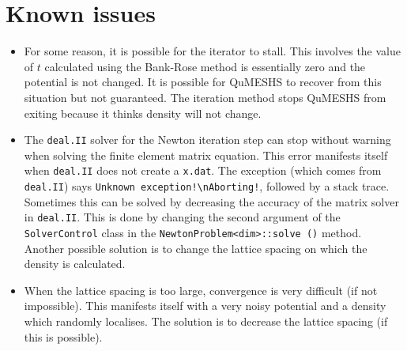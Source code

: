 \documentclass[12pt]{article}
\newcommand{\dealii}{\texttt{deal.II}}
\begin{document}
\section{Known issues}
\begin{itemize}
    \item For some reason, it is possible for the iterator to stall.  This involves the
    value of $t$ calculated using the Bank-Rose method is essentially zero and the potential
    is not changed.  It is possible for QuMESHS to recover from this situation but not
    guaranteed.  The iteration method stops QuMESHS from exiting because it thinks density
    will not change.
    \item The \dealii{} solver for the Newton iteration step can stop without warning
    when solving the finite element matrix equation.  This error manifests itself when
    \dealii{} does not create a \texttt{x.dat}.   The exception (which comes from
    \dealii{}) says \texttt{Unknown exception!\textbackslash nAborting!}, followed by a stack
    trace.  Sometimes this can be solved by decreasing the accuracy of the matrix
    solver in \dealii{}.  This is done by changing the second argument of the \texttt{SolverControl}
    class in the \texttt{NewtonProblem<dim>::solve~()} method.  Another possible solution is
    to change the lattice spacing on which the density is calculated.
    \item When the lattice spacing is too large, convergence is very difficult (if not impossible).
    This manifests itself with a very noisy potential and a density which randomly localises.
    The solution is to decrease the lattice spacing (if this is possible).
\end{itemize}
\end{document}
